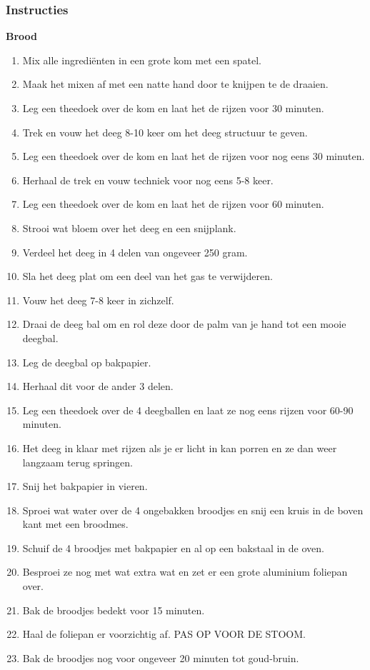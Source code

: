 \subsubsection*{Instructies}
\begin{multicols}{2}
    \textbf{Brood}
    \begin{enumerate}
        \item Mix alle ingrediënten in een grote kom met een spatel.
        \item Maak het mixen af met een natte hand door te knijpen te de draaien.
        \item Leg een theedoek over de kom en laat het de rijzen voor 30 minuten.
        \item Trek en vouw het deeg 8-10 keer om het deeg structuur te geven.
        \item Leg een theedoek over de kom en laat het de rijzen voor nog eens 30 minuten.
        \item Herhaal de trek en vouw techniek voor nog eens 5-8 keer.
        \item Leg een theedoek over de kom en laat het de rijzen voor 60 minuten.
        \item Strooi wat bloem over het deeg en een snijplank.
        \item Verdeel het deeg in 4 delen van ongeveer 250 gram.
        \item Sla het deeg plat om een deel van het gas te verwijderen.
        \item Vouw het deeg 7-8 keer in zichzelf.
        \item Draai de deeg bal om en rol deze door de palm van je hand tot een mooie deegbal.
        \item Leg de deegbal op bakpapier.
        \item Herhaal dit voor de ander 3 delen.
        \item Leg een theedoek over de 4 deegballen en laat ze nog eens rijzen voor 60-90 minuten.
        \item Het deeg in klaar met rijzen als je er licht in kan porren en ze dan weer langzaam terug springen.
        \item Snij het bakpapier in vieren.
        \item Sproei wat water over de 4 ongebakken broodjes en snij een kruis in de boven kant met een broodmes.
        \item Schuif de 4 broodjes met bakpapier en al op een bakstaal in de oven.
        \item Besproei ze nog met wat extra wat en zet er een grote aluminium foliepan over.
        \item Bak de broodjes bedekt voor 15 minuten.
        \item Haal de foliepan er voorzichtig af. PAS OP VOOR DE STOOM.
        \item Bak de broodjes nog voor ongeveer 20 minuten tot goud-bruin.
    \end{enumerate}    
\end{multicols}

